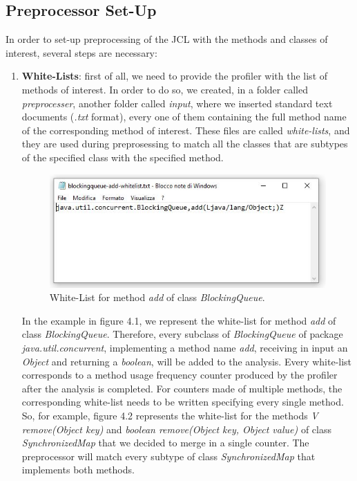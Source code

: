 \documentclass[]{usiinfthesis}
\begin{document}
\subsection{Preprocessor Set-Up}
In order to set-up preprocessing of the JCL with the methods and classes of interest, several steps are necessary:
\begin{enumerate}
    \item \textbf{White-Lists}: first of all, we need to provide the profiler with the list of methods of interest. In order to do so, we created, in a folder called \textit{preprocesser}, another folder called \textit{input}, where we inserted standard text documents (\textit{.txt} format), every one of them containing the full method name of the corresponding method of interest. These files are called \textit{white-lists}, and they are used during preprosessing to match all the classes that are subtypes of the specified class with the specified method.
    \vspace{0.5cm}
    \begin{figure}[h]
        \centering
        \includegraphics[scale=0.7]{Immagini/whitelist.JPG} 
        \caption{White-List for method \textit{add} of class \textit{BlockingQueue}.}
        \label{fig:fig1}
    \end{figure}
    \vspace{0.5cm}
    \newline In the example in figure 4.1, we represent the white-list for method \textit{add} of class \textit{BlockingQueue}. Therefore, every subclass of \textit{BlockingQueue} of package \textit{java.util.concurrent}, implementing a method name \textit{add}, receiving in input an \textit{Object} and returning a \textit{boolean}, will be added to the analysis.
    \newline Every white-list corresponds to a method usage frequency counter produced by the profiler after the analysis is completed. For counters made of multiple methods, the corresponding white-list needs to be written specifying every single method. So, for example, figure 4.2 represents the white-list for the methods \textit{V remove(Object key)} and \textit{boolean remove(Object key, Object value)} of class \textit{SynchronizedMap} that we decided to merge in a single counter. The preprocessor will match every subtype of class \textit{SynchronizedMap} that implements both methods.

\end{enumerate}
\end{document}
